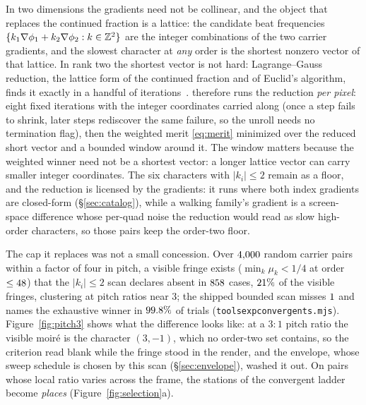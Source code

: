 In two dimensions the gradients need not be collinear, and the object that
replaces the continued fraction is a lattice: the candidate beat frequencies
$\{k_1\nabla\phi_1+k_2\nabla\phi_2 : k\in\mathbb{Z}^2\}$ are the integer combinations
of the two carrier gradients, and the slowest character at \emph{any} order is
the shortest nonzero vector of that lattice. In rank two the shortest vector
is not hard: Lagrange--Gauss reduction, the lattice form of the continued
fraction and of Euclid's algorithm, finds it exactly in a handful of
iterations~\cite{NguyenStehle2009Gauss}. \Moire{} therefore runs the
reduction \emph{per pixel}: eight fixed iterations with the integer
coordinates carried along (once a step fails to shrink, later steps rediscover
the same failure, so the unroll needs no termination flag), then the weighted
merit \eqref{eq:merit} minimized over the reduced short vector and a bounded
window around it. The window matters because the weighted winner need not be
a shortest vector: a longer lattice vector can carry smaller integer
coordinates. The six characters with $\lvert k_i\rvert\le2$ remain as a
floor, and the reduction is licensed by the gradients: it runs where both
index gradients are closed-form (\S\ref{sec:catalog}), while a walking
family's gradient is a screen-space difference whose per-quad noise the
reduction would read as slow high-order characters, so those pairs keep the
order-two floor.

The cap it replaces was not a small concession. Over $4{,}000$ random
carrier pairs within a factor of four in pitch, a visible fringe exists
($\min_k\mu_k<1/4$ at order $\le48$) that the
$\lvert k_i\rvert\le2$ scan declares absent in $858$ cases,
$21\%$ of the visible fringes, clustering at pitch ratios near
$3$; the shipped bounded scan misses $1$ and names the exhaustive
winner in $99.8\%$ of trials
(\texttt{tools\pslash exp\pslash convergents.mjs}). Figure~\ref{fig:pitch3}
shows what the difference looks like: at a $3{:}1$ pitch ratio the visible
moir\'e is the character $(3,-1)$, which no order-two set contains, so the
criterion read blank while the fringe stood in the render, and the envelope,
whose sweep schedule is chosen by this scan
(\S\ref{sec:envelope}), washed it out. On pairs whose local ratio varies
across the frame, the stations of the convergent ladder become \emph{places}
(Figure~\ref{fig:selection}a).

